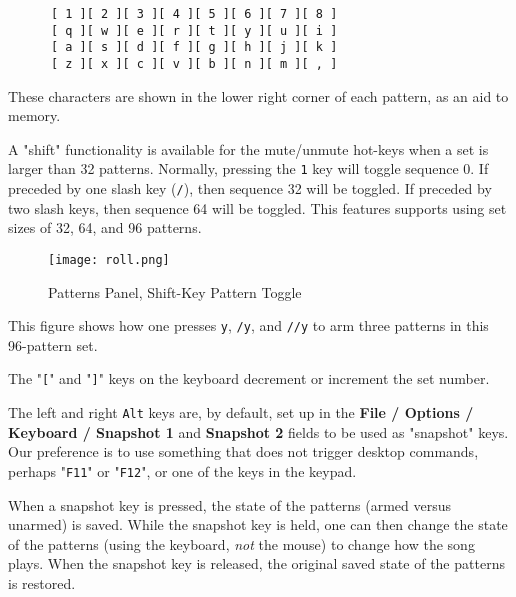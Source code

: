    \begin{verbatim}
      [ 1 ][ 2 ][ 3 ][ 4 ][ 5 ][ 6 ][ 7 ][ 8 ]
      [ q ][ w ][ e ][ r ][ t ][ y ][ u ][ i ]
      [ a ][ s ][ d ][ f ][ g ][ h ][ j ][ k ]
      [ z ][ x ][ c ][ v ][ b ][ n ][ m ][ , ]
   \end{verbatim}

   These characters are shown in the lower right corner of each
   pattern, as an aid to memory.

   A "shift" functionality is available for the
   mute/unmute hot-keys when a set is larger than 32 patterns.
   Normally, pressing the \texttt{1} key will toggle
   sequence 0.  If preceded by one slash key (\texttt{/}), then sequence 32
   will be toggled.  If preceded by two slash keys, then sequence 64 will be
   toggled.  This features supports using set sizes of 32, 64, and 96 patterns.

\begin{figure}[H]
   \centering 
   \texttt{[image: roll.png]}
   \caption{Patterns Panel, Shift-Key Pattern Toggle}
   \label{fig:pattern_window_shift_key_pattern_toggle}
\end{figure}

   This figure shows how one presses \texttt{y}, \texttt{/y}, and \texttt{//y}
   to arm three patterns in this 96-pattern set.

   \index{keys![}
   The "\texttt{[}" and
   \index{keys!]}
   "\texttt{]}" keys on the keyboard decrement or increment the set number.

   The left and right \texttt{Alt} keys are, by default, set up in the
   \textbf{File / Options / Keyboard / Snapshot 1} and
   \textbf{Snapshot 2} fields to be used as "snapshot" keys.
   Our preference is to use something that does not trigger desktop
   commands, perhaps "\texttt{F11}" or "\texttt{F12}", or one of the keys in
   the keypad.

   When a snapshot key is pressed, the state of the patterns
   (armed versus unarmed) is saved.  While the
   snapshot key is held, one can then change the state of the patterns
   (using the keyboard, \textsl{not} the mouse)
   to change how the song plays.  When the snapshot key is released, the
   original saved state of the patterns is restored.


